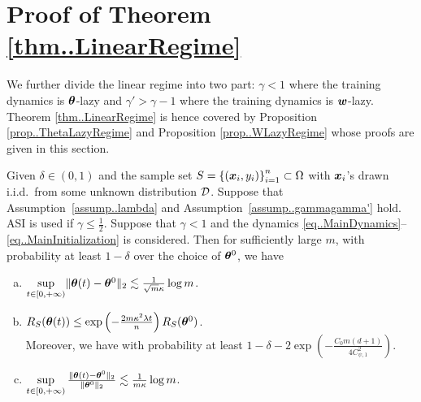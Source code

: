 \documentclass{article}
\begin{document}
\section{Proof of Theorem \ref{thm..LinearRegime}}
We further divide the linear regime into two part: $\gamma<1$ where the training dynamics is $\bm{\theta}$-lazy and $\gamma'>\gamma-1$ where the training dynamics is $\bm{w}$-lazy. Theorem \ref{thm..LinearRegime} is hence covered by Proposition \ref{prop..ThetaLazyRegime} and Proposition \ref{prop..WLazyRegime} whose proofs are given in this section.
\begin{prop}\label{prop..ThetaLazyRegime}
    Given $\delta\in(0,1)$ and the sample set $S = {\{(\bm{x}_i, y_i)\}}_{i=1}^n\subset\Omega$ with $\bm{x}_i$'s drawn i.i.d.\ from some unknown distribution $\mathcal{D}$. Suppose that Assumption~\ref{assump..lambda} and Assumption~\ref{assump..gammagamma'} hold. ASI is used if $\gamma\leq\frac{1}{2}$. Suppose that $\gamma<1$ and the dynamics \eqref{eq..MainDynamics}--\eqref{eq..MainInitialization} is considered. Then for sufficiently large $m$, with probability at least $1-\delta$ over the choice of $\bm{\theta}^0$, we have
    \begin{enumerate}[(a)]
        \item $\sup\limits_{t\in[0,+\infty)}\lVert\bm{\theta}(t)-\bm{\theta}^0\rVert_2\lesssim\frac{1}{\sqrt{m}\kappa}\log m$.
        \item $R_S(\bm{\theta}(t))\leq \exp\left(-\frac{2m\kappa^2\lambda t}{n}\right)R_S(\bm{\theta}^0)$. \\
              Moreover, we have with probability at least $1-\delta-2\exp\left(-\frac{C_0m(d+1)}{4C^2_{\psi,1}}\right)$.
        \item $\sup\limits_{t\in[0,+\infty)}\frac{\lVert\bm{\theta}(t)-\bm{\theta}^0\rVert_2}{\lVert\bm{\theta}^0\rVert_2}\lesssim\frac{1}{m\kappa}\log m$.
    \end{enumerate}
\end{prop}
\end{document}

